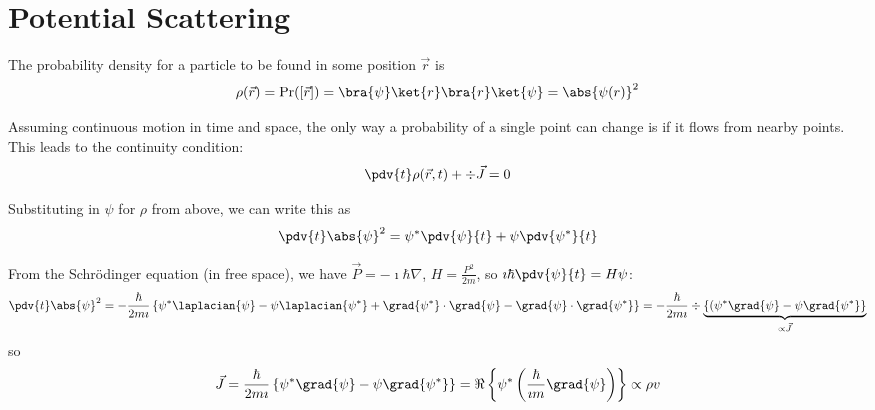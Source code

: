 \documentclass[a4paper,twoside,master.tex]{subfiles}
\begin{document}
\chapter{Potential Scattering}
The probability density for a particle to be found in some position $ \vec{r} $ is
\begin{equation}
    \rho( \vec{r}) = \Pr([ \vec{r}]) = \bra{\psi} \ket{r} \bra{r} \ket{\psi} = \abs{\psi(r)}^2
\end{equation}

Assuming continuous motion in time and space, the only way a probability of a single point can change is if it flows from nearby points. This leads to the continuity condition:
\begin{equation}
    \pdv{t} \rho( \vec{r}, t) + \div{ \vec{J}} = 0
\end{equation}

Substituting in $ \psi $ for $ \rho $ from above, we can write this as
\begin{equation}
    \pdv{t} \abs{\psi}^2 = \psi^* \pdv{\psi}{t} + \psi \pdv{\psi^*}{t}
\end{equation}

From the Schr\"odinger equation (in free space), we have $ \vec{P} = -\imath\hbar\nabla $, $ H = \frac{P^2}{2m} $, so $ \imath\hbar \pdv{\psi}{t}= H \psi $:
\begin{equation}
    \pdv{t} \abs{\psi}^2 = - \frac{\hbar}{2m\imath} \left\{ \psi^* \laplacian{\psi} - \psi \laplacian{\psi^*} + \grad{\psi^*} \cdot\grad{\psi} - \grad{\psi} \cdot \grad{\psi^*}  \right\} = - \frac{\hbar}{2m\imath} \div{\underbrace{\left\{(\psi^* \grad{\psi} - \psi \grad{\psi^*}  \right\}}_{\propto\vec{J}}}
\end{equation}
so
\begin{equation}
    \vec{J} = \frac{\hbar}{2m\imath} \left\{ \psi^* \grad{\psi} - \psi \grad{\psi^*} \right\} = \Re\left\{ \psi^* \left( \frac{\hbar}{\imath m} \grad{\psi} \right) \right\}\propto \rho v
\end{equation}
\end{document}

